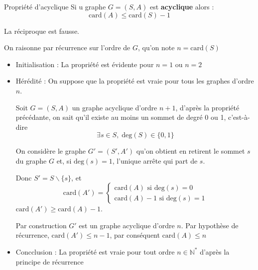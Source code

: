   \begin{Corollary}{Propriété d'acyclique}{}
  Si u graphe $G = (S,A)$ est \textbf{acyclique} alors :
  \[
  \mathrm{car d}(A) \le \mathrm{car d}(S) - 1
  \]

  La réciproque est fausse.
  \end{Corollary}

  \begin{myproof}
  On raisonne par récurrence sur l'ordre de $G$, qu'on note $n = \mathrm{car d}(S)$

  \begin{itemize}
      \item Initialisation : La propriété est évidente pour $n=1$ ou $n=2$

      \item Hérédité : On suppose que la propriété est vraie pour tous les graphes d'ordre $n$.

          Soit $G = (S,A)$ un graphe acyclique d'ordre $n+1$, d'après la propriété précédante, on sait qu'il existe au moins un sommet de degré 0 ou 1, c'est-à-dire  
          \[
              \exists  s \in S, \; \mathrm{deg} (S) \in \{0,1\}
          \]
         
          On considère le graphe $G' = (S', A')$ qu'on obtient en retirent le sommet  $s$ du graphe $G$ et, si $\mathrm{deg} (s)=1$, l'unique arrête qui part de $s$. 

          Donc $S'= S \backslash \{s\}$, et 
          \[
          \mathrm{car d}(A') = \begin{cases}
              \mathrm{car d}(A) \text{ si } \mathrm{deg} (s) = 0 \\
              \mathrm{car d}(A) - 1 \text{ si } \mathrm{deg}(s) = 1  
          \end{cases} 
          \]
         $\mathrm{car d}(A') \ge   \mathrm{car d} (A) -1$.

         Par construction $G'$ est un graphe acyclique d'ordre  $n$. Par hypothèse de récurrence, $\mathrm{car d}(A') \le  n-1$, par conséquent $\mathrm{car d} (A) \le n$ 

      \item Concclusion : La propriété est vraie pour tout ordre $n \in \mathbb{N} ^{*}$ d'après la principe de récurrence
  \end{itemize}


\end{myproof}

